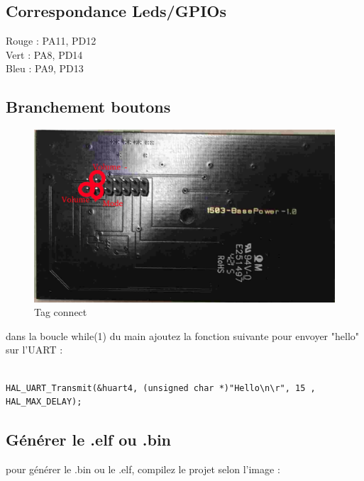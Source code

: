 \documentclass{article}
\begin{document}
\subsection{Correspondance Leds/GPIOs}

Rouge : PA11, PD12 \\
Vert : PA8, PD14 \\
Bleu : PA9, PD13 \\

\subsection{Branchement boutons}

\begin{figure}[H]
\begin{center}
\advance\leftskip-3cm
\advance\rightskip-3cm
\includegraphics[keepaspectratio=true,scale=0.3]{branchement_boutons2.png}
\caption{Tag connect}
\label{visina8}
\end{center}\end{figure}

dans la boucle while(1) du main ajoutez la fonction suivante pour envoyer "hello" sur l'UART :
\begin{verbatim}

HAL_UART_Transmit(&huart4, (unsigned char *)"Hello\n\r", 15 , HAL_MAX_DELAY);

\end{verbatim}

\subsection{Générer le .elf ou .bin}

pour générer le .bin ou le .elf, compilez le projet selon l'image :
\end{document}

